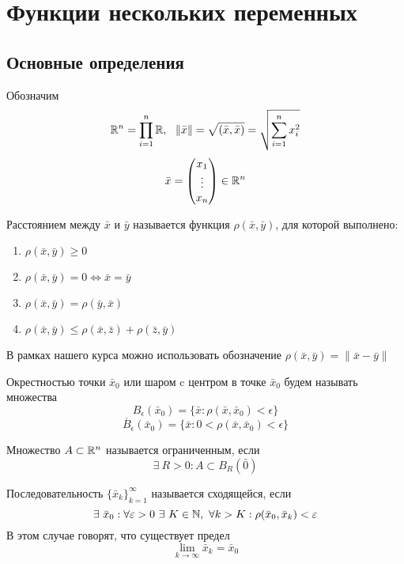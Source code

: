\newpage
\section{Функции нескольких переменных}
\subsection{Основные определения}
Обозначим
\[\R^n=\prod\limits_{i=1}^{n}\R,\ \ \|\bar{x}\|=\sqrt{(\bar{x},\bar{x})}=\sqrt{\sum\limits_{i=1}^{n}x_i^2}\]
\[\bar{x}=\begin{pmatrix}
    x_1\\
    \vdots\\
    x_n
\end{pmatrix}\in \mathbb{R}^n\]
\begin{definition}
    Расстоянием между $\bar{x}$ и $\bar{y}$ называется функция $\rho(\bar{x}, \bar{y})$, для которой выполнено:
    \begin{enumerate}
        \item $\rho(\bar{x}, \bar{y})\geq 0$
        \item $\rho(\bar{x}, \bar{y})=0 \Leftrightarrow \bar{x}=\bar{y}$
        \item $\rho(\bar{x}, \bar{y})=\rho(\bar{y}, \bar{x})$
        \item $\rho(\bar{x}, \bar{y})\leq \rho(\bar{x}, \bar{z})+\rho(\bar{z}, \bar{y})$
    \end{enumerate}
    В рамках нашего курса можно использовать обозначение $\rho(\bar{x}, \bar{y})=\|\bar{x}-\bar{y}\|$
\end{definition} 
\begin{definition} Окрестностью точки $\bar{x}_0$ или шаром c центром в точке $\bar{x}_0$ будем называть множества
    \[B_{\epsilon}(\bar{x}_0)=\{\bar{x}: \rho(\bar{x}, \bar{x}_0)<\epsilon\}\]
    \[\mathring{B_{\epsilon}}(\bar{x}_0)=\{\bar{x}: 0<\rho(\bar{x}, \bar{x}_0)<\epsilon\}\]
\end{definition}
\begin{definition}
    Множество $A\subset \mathbb{R}^n$ называется ограниченным, если 
    \[\exists\ R>0: A\subset B_{R}(\bar{0})\]
\end{definition}
\begin{definition}
    Последовательность $\{\bar{x}_k\}_{k=1}^{\infty}$ называется сходящейся, если 
    \[\exists\ \bar{x}_0: \forall \epsilon>0\ \exists\ K\in \N,\ \forall k>K: \rho(\bar{x}_0, \bar{x}_k)<\epsilon\]
    В этом случае говорят, что существует предел
    \[\lim\limits_{k\to \infty}\bar{x}_k=\bar{x}_0\]
\end{definition} 
